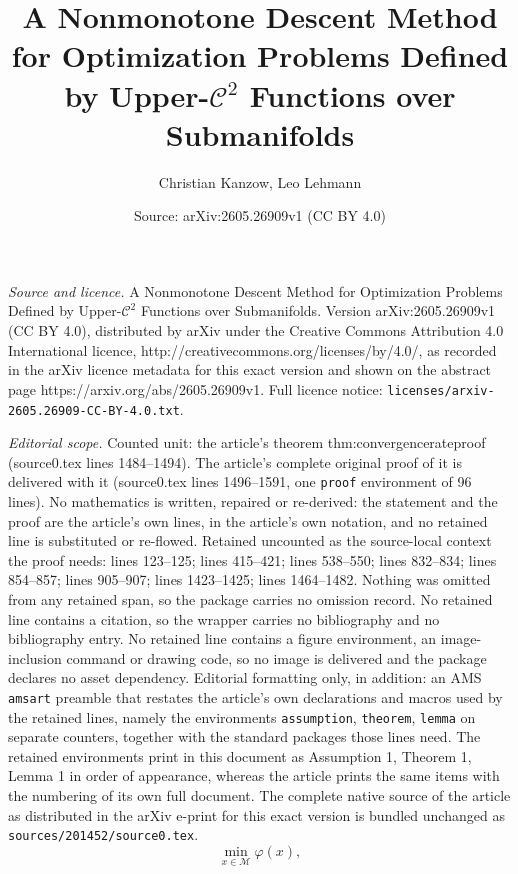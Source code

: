 \documentclass[10pt,a4paper]{amsart}
\title{A Nonmonotone Descent Method for Optimization Problems Defined by Upper-$\mathcal{C}^2 $ Functions over Submanifolds}
\author{Christian Kanzow, Leo Lehmann}
\date{Source: arXiv:2605.26909v1 (CC BY 4.0)}
\begin{document}
\maketitle

\noindent\emph{Source and licence.} A Nonmonotone Descent Method for Optimization Problems Defined by Upper-$\mathcal{C}^2 $ Functions over Submanifolds. Version arXiv:2605.26909v1 (CC BY 4.0), distributed by arXiv under the Creative Commons Attribution 4.0 International licence, http://creativecommons.org/licenses/by/4.0/, as recorded in the arXiv licence metadata for this exact version and shown on the abstract page https://arxiv.org/abs/2605.26909v1. Full licence notice: \texttt{licenses/arxiv-2605.26909-CC-BY-4.0.txt}.\par\smallskip

\noindent\textit{Editorial scope.} Counted unit: the article's theorem thm:convergencerateproof (source0.tex lines 1484--1494). The article's complete original proof of it is delivered with it (source0.tex lines 1496--1591, one \texttt{proof} environment of 96 lines). No mathematics is written, repaired or re-derived: the statement and the proof are the article's own lines, in the article's own notation, and no retained line is substituted or re-flowed.  Retained uncounted as the source-local context the proof needs: lines 123--125; lines 415--421; lines 538--550; lines 832--834; lines 854--857; lines 905--907; lines 1423--1425; lines 1464--1482.  Nothing was omitted from any retained span, so the package carries no omission record.  No retained line contains a citation, so the wrapper carries no bibliography and no bibliography entry.  No retained line contains a figure environment, an image-inclusion command or drawing code, so no image is delivered and the package declares no asset dependency.  Editorial formatting only, in addition: an AMS \texttt{amsart} preamble that restates the article's own declarations and macros used by the retained lines, namely the environments \texttt{assumption}, \texttt{theorem}, \texttt{lemma} on separate counters, together with the standard packages those lines need.  The retained environments print in this document as Assumption 1, Theorem 1, Lemma 1 in order of appearance, whereas the article prints the same items with the numbering of its own full document.  The complete native source of the article as distributed in the arXiv e-print for this exact version is bundled unchanged as \texttt{sources/201452/source0.tex}.
\begin{equation}\label{eq:prob}
	\min_{x \in \mathcal{M}} \varphi(x),
\end{equation}
\end{document}
